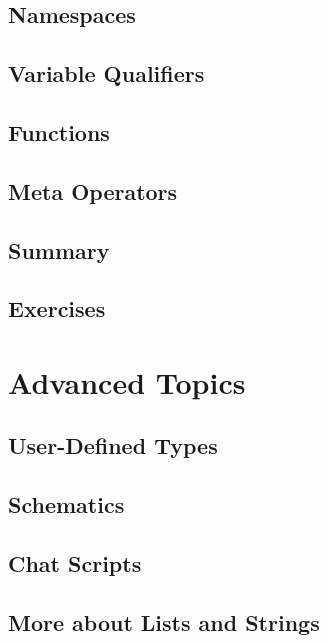 \documentclass[oneside]{book}
\begin{document}
\section{Namespaces}
\blindtext

\section{Variable Qualifiers}
\blindtext

\section{Functions}
\blindtext

\section{Meta Operators}
\blindtext

\section{Summary}
\blindtext

\section{Exercises}
\blindtext

\chapter{Advanced Topics}
\blindtext

\section{User-Defined Types}
\blindtext

\section{Schematics}
\blindtext

\section{Chat Scripts}
\blindtext

\section{More about Lists and Strings}
\blindtext
\end{document}

